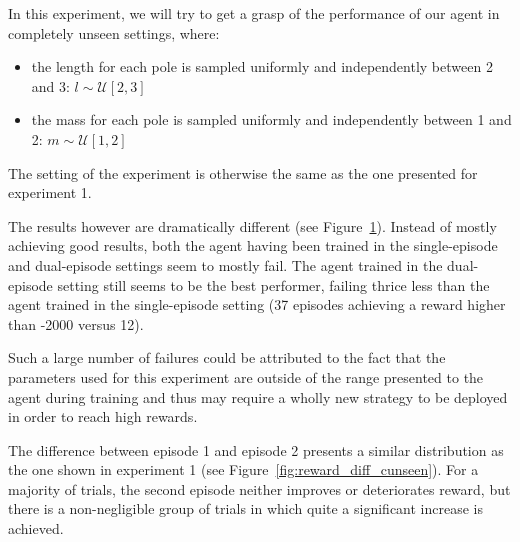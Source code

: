 \documentclass[letterpaper]{article}
\begin{document}
In this experiment, we will try to get a grasp of the performance of our agent
in completely unseen settings, where:
\begin{itemize}
	\item the length for each pole is sampled uniformly and independently 
		between 2 and 3:
		$l \sim \mathcal{U}[2, 3] $
	\item the mass for each pole is sampled uniformly and independently 
		between 1 and 2:
		$m \sim \mathcal{U}[1, 2] $
\end{itemize}

The setting of the experiment is otherwise the same as the one presented for
experiment 1.

The results however are dramatically different (see
Figure~\ref{fig:distrib_cunseen}). Instead of mostly
achieving good results, both the agent having been trained in the single-episode
and dual-episode settings seem to mostly fail. The agent trained
in the dual-episode setting still seems to be the best performer, failing thrice
less than the agent trained in the single-episode setting (37 episodes
achieving a reward higher than -2000 versus 12).

Such a large number of failures could be attributed to the fact that the
parameters used for this experiment are outside of the range presented to
the agent during training and thus may require a wholly new strategy to be
deployed in order to reach high rewards.

The difference between episode 1 and episode 2 presents a similar distribution
as the one shown in experiment 1 (see Figure~\ref{fig:reward_diff_cunseen}). 
For a majority of trials, the second episode
neither improves or deteriorates reward, but there is a non-negligible group
of trials in which quite a significant increase is achieved.


\begin{figure}
	\centering
	\caption{}
	\label{fig:distrib_cunseen}
\end{figure}
\end{document}

